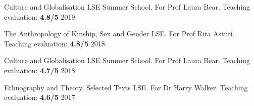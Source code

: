 

\begin{cvexperiences}
  \cvexperience
    {Culture and Globalisation} %
    {LSE Summer School. For Prof Laura Bear. Teaching evaluation: \textbf{4.8/5}} %
    {2019} %

  \cvexperience
    {The Anthropology of Kinship, Sex and Gender} %
    {LSE. For Prof Rita Astuti. Teaching evaluation: \textbf{4.8/5}} %
    {2018} %

  \cvexperience
    {Culture and Globalisation} %
    {LSE Summer School. For Prof Laura Bear. Teaching evaluation: \textbf{4.7/5}} %
    {2018} %

  \cvexperience
    {Ethnography and Theory, Selected Texts} %
    {LSE. For Dr Harry Walker. Teaching evaluation: \textbf{4.6/5}} %
    {2017} %

\end{cvexperiences}

